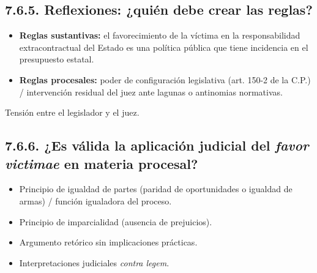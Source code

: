 \subsection{7.6.5. Reflexiones: ¿quién debe crear las reglas?}
\begin{itemize}
\item \textbf{Reglas sustantivas:} el favorecimiento de la víctima en la responsabilidad extracontractual del Estado es una política pública que tiene incidencia en el presupuesto estatal.
\item \textbf{Reglas procesales:} poder de configuración legislativa (art. 150-2 de la C.P.) / intervención residual del juez ante lagunas o antinomias normativas.
\end{itemize}
Tensión entre el legislador y el juez.

\subsection{7.6.6. ¿Es válida la aplicación judicial del \textit{favor victimae} en materia procesal?}
\begin{itemize}
\item Principio de igualdad de partes (paridad de oportunidades o igualdad de armas) / función igualadora del proceso.
\item Principio de imparcialidad (ausencia de prejuicios).
\item Argumento retórico sin implicaciones prácticas.
\item Interpretaciones judiciales \textit{contra legem}.
\end{itemize}
